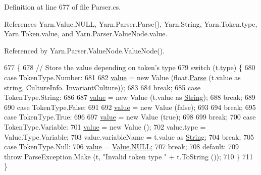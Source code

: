 Definition at line 677 of file Parser.\-cs.



References Yarn.\-Value.\-N\-U\-L\-L, Yarn.\-Parser.\-Parse(), Yarn.\-String, Yarn.\-Token.\-type, Yarn.\-Token.\-value, and Yarn.\-Parser.\-Value\-Node.\-value.



Referenced by Yarn.\-Parser.\-Value\-Node.\-Value\-Node().


\begin{DoxyCode}
677                                            \{
678                 \textcolor{comment}{// Store the value depending on token's type}
679                 \textcolor{keywordflow}{switch} (t.type) \{
680                 \textcolor{keywordflow}{case} TokenType.Number:
681 
682                     \hyperlink{a00188_a51ab5939344f9bfa21181c02cf0e341d}{value} = \textcolor{keyword}{new} Value (\textcolor{keywordtype}{float}.\hyperlink{a00149_a811cc7226f4f4a2f3440cdb67ad14468}{Parse} (t.value as \textcolor{keywordtype}{string}, CultureInfo.
      InvariantCulture));
683 
684                     \textcolor{keywordflow}{break};
685                 \textcolor{keywordflow}{case} TokenType.String:
686 
687                     \hyperlink{a00188_a51ab5939344f9bfa21181c02cf0e341d}{value} = \textcolor{keyword}{new} Value (t.value as \hyperlink{a00051_a301aa7c866593a5b625a8fc158bbeacea27118326006d3829667a400ad23d5d98}{String});
688                     \textcolor{keywordflow}{break};
689 
690                 \textcolor{keywordflow}{case} TokenType.False:
691 
692                     \hyperlink{a00188_a51ab5939344f9bfa21181c02cf0e341d}{value} = \textcolor{keyword}{new} Value (\textcolor{keyword}{false});
693 
694                     \textcolor{keywordflow}{break};
695                 \textcolor{keywordflow}{case} TokenType.True:
696 
697                     \hyperlink{a00188_a51ab5939344f9bfa21181c02cf0e341d}{value} = \textcolor{keyword}{new} Value (\textcolor{keyword}{true});
698 
699                     \textcolor{keywordflow}{break};
700                 \textcolor{keywordflow}{case} TokenType.Variable:
701                     \hyperlink{a00188_a51ab5939344f9bfa21181c02cf0e341d}{value} = \textcolor{keyword}{new} Value ();
702                     value.type = Value.Type.Variable;
703                     value.variableName = t.value as \hyperlink{a00051_a301aa7c866593a5b625a8fc158bbeacea27118326006d3829667a400ad23d5d98}{String};
704                     \textcolor{keywordflow}{break};
705                 \textcolor{keywordflow}{case} TokenType.Null:
706                     \hyperlink{a00188_a51ab5939344f9bfa21181c02cf0e341d}{value} = \hyperlink{a00187_a1ed2964965baca8621c45efa23f37660}{Value.NULL};
707                     \textcolor{keywordflow}{break};
708                 \textcolor{keywordflow}{default}:
709                     \textcolor{keywordflow}{throw} ParseException.Make (t, \textcolor{stringliteral}{"Invalid token type "} + t.ToString ());
710                 \}
711             \}
\end{DoxyCode}


